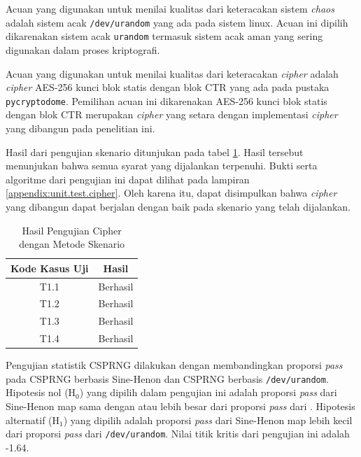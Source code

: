 Acuan yang digunakan untuk menilai kualitas dari keteracakan sistem \emph{chaos} adalah sistem acak \texttt{/dev/urandom} yang ada pada sistem linux. Acuan ini dipilih dikarenakan sistem acak \texttt{urandom} termasuk sistem acak aman yang sering digunakan dalam proses kriptografi. 

Acuan yang digunakan untuk menilai kualitas dari keteracakan \emph{cipher} adalah \emph{cipher} AES-256 kunci blok statis dengan blok CTR yang ada pada pustaka \texttt{pycryptodome}. Pemilihan acuan ini dikarenakan AES-256 kunci blok statis dengan blok CTR merupakan \emph{cipher} yang setara dengan implementasi \emph{cipher} yang dibangun pada penelitian ini.

Hasil dari pengujian skenario ditunjukan pada tabel \ref{tab:test.result.cipher}. Hasil tersebut menunjukan bahwa semua syarat yang dijalankan terpenuhi. Bukti serta algoritme dari pengujian ini dapat dilihat pada lampiran \ref{appendix:unit.test.cipher}. Oleh karena itu, dapat disimpulkan bahwa \emph{cipher} yang dibangun dapat berjalan dengan baik pada skenario yang telah dijalankan.

\begin{table}[!h]
  \centering
  \caption{Hasil Pengujian Cipher dengan Metode Skenario} \label{tab:test.result.cipher}
  \begin{tabular}{|c|c|}
    \hline
    \textbf{Kode Kasus Uji} & \textbf{Hasil} \\ \hline
    T1.1 & Berhasil \\ \hline
    T1.2 & Berhasil \\ \hline
    T1.3 & Berhasil \\ \hline
    T1.4 & Berhasil \\ \hline
  \end{tabular}
\end{table}

Pengujian statistik CSPRNG dilakukan dengan membandingkan proporsi \emph{pass} pada CSPRNG berbasis Sine-Henon dan CSPRNG berbasis \texttt{/dev/urandom}. Hipotesis nol ($\text{H}_0$) yang dipilih dalam pengujian ini adalah proporsi \emph{pass} dari Sine-Henon map sama dengan atau lebih besar dari proporsi \emph{pass} dari \text. Hipotesis alternatif ($\text{H}_1$) yang dipilih adalah proporsi \emph{pass} dari Sine-Henon map lebih kecil dari proporsi \emph{pass} dari \texttt{/dev/urandom}. Nilai titik kritis dari pengujian ini adalah -1.64.

